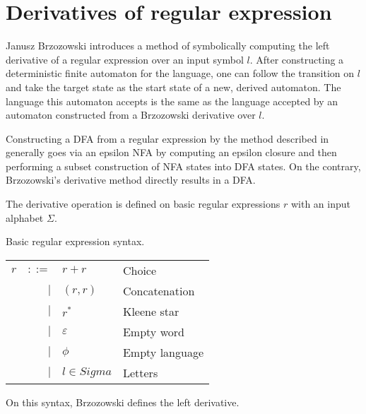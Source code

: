 \section{Derivatives of regular expression}

Janusz Brzozowski introduces a method of symbolically computing the left
derivative of a regular expression over an input symbol $l$. After constructing
a deterministic finite automaton for the language, one can follow the transition
on $l$ and take the target state as the start state of a new, derived automaton.
The language this automaton accepts is the same as the language accepted by an
automaton constructed from a Brzozowski derivative over $l$.

Constructing a DFA from a regular expression by the method described in
\cite{thompson} generally goes via an epsilon NFA by computing an epsilon
closure and then performing a subset construction of NFA states into DFA states.
On the contrary, Brzozowski's derivative method directly results in a DFA.

The derivative operation is defined on basic regular expressions $r$ with an
input alphabet $\Sigma$.

\begin{defn}
   \label{defn-bre}
   Basic regular expression syntax.

   \begin{tabular}{lrll}
      $r$	& $::=$	& $r+r$				& Choice		\\
		& $|$	& $(r,r)$			& Concatenation		\\
		& $|$	& $r^*$				& Kleene star		\\
		& $|$	& $\varepsilon$			& Empty word		\\
		& $|$	& $\phi$			& Empty language	\\
		& $|$	& $l \in Sigma$			& Letters		\\
   \end{tabular}
\end{defn}

On this syntax, Brzozowski defines the left derivative.

